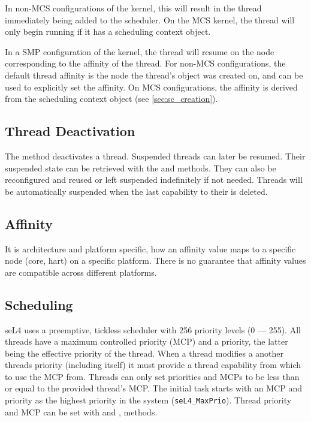 In non-MCS configurations of the kernel, this will result in the thread immediately being added to
the scheduler. On the MCS kernel, the thread will only begin running if it has a
scheduling context object.

In a SMP configuration of the kernel, the thread will resume on the node
corresponding to the affinity of the thread. For non-MCS configurations, the
default thread affinity is the node the thread's  object was created
on, and  can be used to
explicitly set the affinity. On MCS configurations, the affinity is derived
from the scheduling context object (see \autoref{sec:sc_creation}).

\subsection{Thread Deactivation}
\label{sec:thread_deactivation}

The  method deactivates a thread.
Suspended threads can later be resumed.
Their suspended state can be retrieved with the
 and
 methods.
They can also be reconfigured and
reused or left suspended indefinitely if not needed. Threads will be
automatically suspended when the last capability to their  is
deleted.

\subsection{Affinity}
\label{sec:thread_affinity}

It is architecture and platform specific, how an affinity value maps to a
specific node (core, hart) on a specific platform. There is no guarantee that
affinity values are compatible across different platforms.


\subsection{Scheduling}
\label{sec:sched}

seL4 uses a preemptive, tickless scheduler with 256 priority levels (0 --- 255).  All threads have
a maximum controlled priority (MCP) and a priority, the latter being the effective priority of the
thread.
When a thread modifies a another threads priority (including itself) it must provide a
thread capability from which to use the MCP from. Threads can only set priorities and MCPs
to be less than or equal to the provided thread's MCP.
The initial task starts with an MCP and priority as the highest priority in the system (\texttt{seL4\_MaxPrio}).
Thread priority and MCP can be
set with  and
,
 methods.


